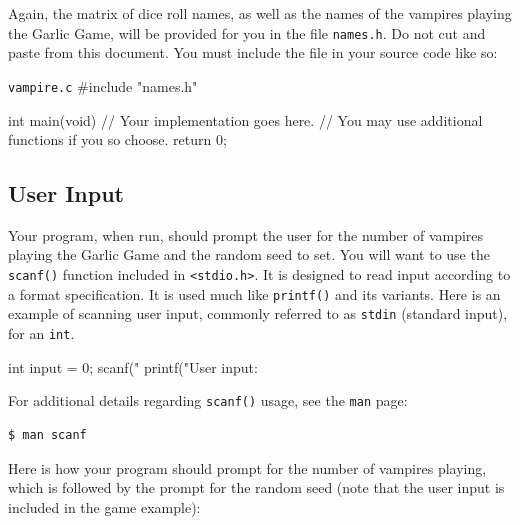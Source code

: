 \documentclass[11pt]{article}
\begin{document}
Again, the matrix of dice roll names, as well as the names of the vampires
playing the Garlic Game, will be provided for you in the file \texttt{names.h}.
Do not cut and paste from this document. You must include the file in your
source code like so:

\begin{codelisting}{\texttt{vampire.c}}
#include "names.h"

int main(void) {
    // Your implementation goes here.
    // You may use additional functions if you so choose.
    return 0;
}
\end{codelisting}

\subsection{User Input}

Your program, when run, should prompt the user for the number of vampires
playing the Garlic Game and the random seed to set. You will want to use the
\texttt{scanf()} function included in \texttt{<stdio.h>}. It is designed to read
input according to a format specification. It is used much like
\texttt{printf()} and its variants.  Here is an example of scanning user input,
commonly referred to as \texttt{stdin} (standard input), for an \texttt{int}.

\begin{codelisting}{}
int input = 0;
scanf("%
printf("User input: %
\end{codelisting}

For additional details regarding \texttt{scanf()} usage, see the \texttt{man}
page:

\begin{lstlisting}[style=bashstyle]
  $ man scanf
\end{lstlisting}

Here is how your program should prompt for the number of vampires playing, which
is followed by the prompt for the random seed (note that the user input is
included in the game example):
\end{document}

